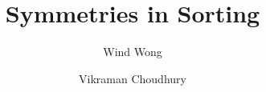 \documentclass[a4paper,UKenglish,cleveref]{lipics-v2021}
\title{Symmetries in Sorting}
\author{Wind Wong}{Amsterdam}{t.f.w.wong@vu.nl}{orcid}{funding}
\author{Vikraman Choudhury}{Bologna}{vikraman.choudhury@unibo.it}{[orcid]}{[funding]}
\begin{document}
\maketitle

\begin{abstract}
  
\end{abstract}



\renewcommand{\appendixsectionformat}[2]{
  {Supplementary material for Section~#1 (#2)}
}


\appendix
\end{document}
